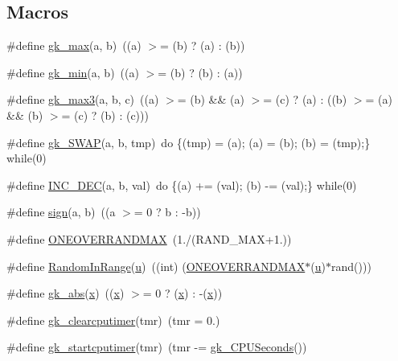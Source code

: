 \subsection*{Macros}
\begin{DoxyCompactItemize}
\item 
\#define \hyperlink{a00053_ae65283b4fbbdd7bcfc1e681dd649532f}{gk\+\_\+max}(a,  b)~((a) $>$= (b) ? (a) \+: (b))
\item 
\#define \hyperlink{a00053_ae94627fa347c3b7d3f49bccbd01db40a}{gk\+\_\+min}(a,  b)~((a) $>$= (b) ? (b) \+: (a))
\item 
\#define \hyperlink{a00053_a59d917b880bd999d33f0eb00d01c929e}{gk\+\_\+max3}(a,  b,  c)~((a) $>$= (b) \&\& (a) $>$= (c) ? (a) \+: ((b) $>$= (a) \&\& (b) $>$= (c) ? (b) \+: (c)))
\item 
\#define \hyperlink{a00053_ab9902a1b34cd7bb990d209a8235d8ebe}{gk\+\_\+\+S\+W\+AP}(a,  b,  tmp)~do \{(tmp) = (a); (a) = (b); (b) = (tmp);\} while(0)
\item 
\#define \hyperlink{a00053_a204beac01a28654b3ddd7eea0d6597fa}{I\+N\+C\+\_\+\+D\+EC}(a,  b,  val)~do \{(a) += (val); (b) -\/= (val);\} while(0)
\item 
\#define \hyperlink{a00053_a4ddfa141f8142902738a2e1683a95a71}{sign}(a,  b)~((a $>$= 0 ? b \+: -\/b))
\item 
\#define \hyperlink{a00053_a0d67a57499e3f48596b2f83d8c1f9129}{O\+N\+E\+O\+V\+E\+R\+R\+A\+N\+D\+M\+AX}~(1./(R\+A\+N\+D\+\_\+\+M\+AX+1.))
\item 
\#define \hyperlink{a00053_afaa28aba2e28c516143145a22176039f}{Random\+In\+Range}(\hyperlink{a00605_a6277e2a7446059985dc9bcf0a4ac1a8f}{u})~((int) (\hyperlink{a00053_a0d67a57499e3f48596b2f83d8c1f9129}{O\+N\+E\+O\+V\+E\+R\+R\+A\+N\+D\+M\+AX}$\ast$(\hyperlink{a00605_a6277e2a7446059985dc9bcf0a4ac1a8f}{u})$\ast$rand()))
\item 
\#define \hyperlink{a00053_acb1e6d47e55366b53979ecedfa821ab7}{gk\+\_\+abs}(\hyperlink{a00605_ac98c3bb25378222646e977292011625f}{x})~((\hyperlink{a00605_ac98c3bb25378222646e977292011625f}{x}) $>$= 0 ? (\hyperlink{a00605_ac98c3bb25378222646e977292011625f}{x}) \+: -\/(\hyperlink{a00605_ac98c3bb25378222646e977292011625f}{x}))
\item 
\#define \hyperlink{a00053_ad61826bab6f07c5945ee4d2b46acfbcc}{gk\+\_\+clearcputimer}(tmr)~(tmr = 0.)
\item 
\#define \hyperlink{a00053_a8fd4c35dbcc4dce28ea11c88ea326f2c}{gk\+\_\+startcputimer}(tmr)~(tmr -\/= \hyperlink{a00158_a3e9b43a695411f5f0b3396083fe688d6}{gk\+\_\+\+C\+P\+U\+Seconds}())

\end{DoxyCompactItemize}
